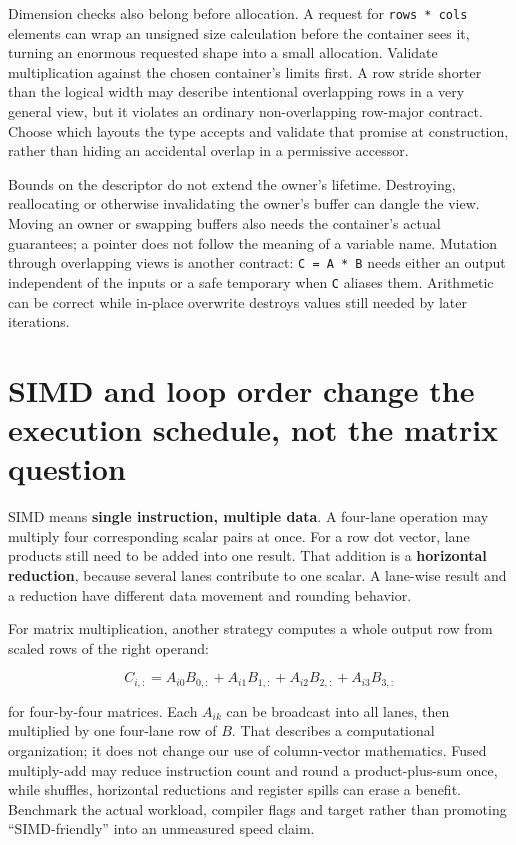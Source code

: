 Dimension checks also belong before allocation. A request for \texttt{rows\ *\ cols} elements can wrap an unsigned size calculation before the container sees it, turning an enormous requested shape into a small allocation. Validate multiplication against the chosen container's limits first. A row stride shorter than the logical width may describe intentional overlapping rows in a very general view, but it violates an ordinary non-overlapping row-major contract. Choose which layouts the type accepts and validate that promise at construction, rather than hiding an accidental overlap in a permissive accessor.

Bounds on the descriptor do not extend the owner's lifetime. Destroying, reallocating or otherwise invalidating the owner's buffer can dangle the view. Moving an owner or swapping buffers also needs the container's actual guarantees; a pointer does not follow the meaning of a variable name. Mutation through overlapping views is another contract: \texttt{C\ =\ A\ *\ B} needs either an output independent of the inputs or a safe temporary when \texttt{C} aliases them. Arithmetic can be correct while in-place overwrite destroys values still needed by later iterations.

\section{SIMD and loop order change the execution schedule, not the matrix question}\label{02-foundations-ii-ch038-simd-and-loop-order-change-the-execution-schedule-not-the-matrix-question}

SIMD means \textbf{single instruction, multiple data}. A four-lane operation may multiply four corresponding scalar pairs at once. For a row dot vector, lane products still need to be added into one result. That addition is a \textbf{horizontal reduction}, because several lanes contribute to one scalar. A lane-wise result and a reduction have different data movement and rounding behavior.

For matrix multiplication, another strategy computes a whole output row from scaled rows of the right operand:

\[
C_{i,:}=A_{i0}B_{0,:}+A_{i1}B_{1,:}+A_{i2}B_{2,:}+A_{i3}B_{3,:}
\]

for four-by-four matrices. Each \(A_{ik}\) can be broadcast into all lanes, then multiplied by one four-lane row of \(B\). That describes a computational organization; it does not change our use of column-vector mathematics. Fused multiply-add may reduce instruction count and round a product-plus-sum once, while shuffles, horizontal reductions and register spills can erase a benefit. Benchmark the actual workload, compiler flags and target rather than promoting ``SIMD-friendly'' into an unmeasured speed claim.

